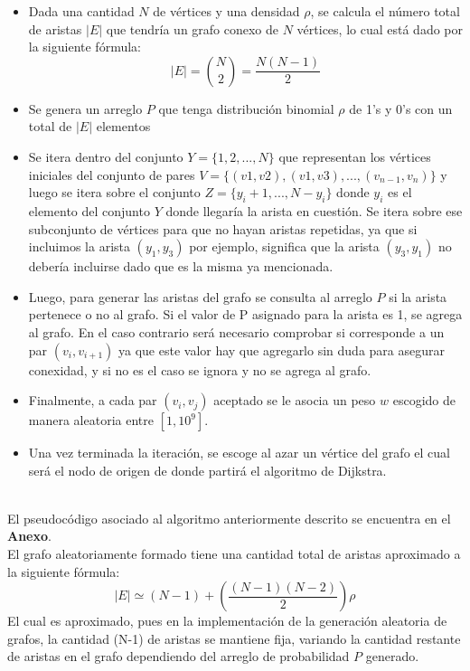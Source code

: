\documentclass[11pt]{article}
\begin{document}
\begin{itemize}
    \item Dada una cantidad $N$ de vértices y una densidad $\rho$, se calcula el número total de aristas $|E|$ que tendría un grafo conexo de $N$ vértices, lo cual está dado por la siguiente fórmula:
    \begin{equation*}
        |E| = \binom{N}{2}= \frac{N(N-1)}{2}
    \end{equation*}
    \item Se genera un arreglo $P$ que tenga distribución binomial $\rho$ de 1's y 0's con un total de $|E|$ elementos
    \item Se itera dentro del conjunto $Y = \{1,2, ..., N\}$ que representan los vértices iniciales del conjunto de pares $V = \{(v1,v2), (v1, v3), ..., (v_{n-1}, v_{n})\}$ y luego se itera sobre el conjunto $Z = \{y_i+1, ..., N-y_i\}$ donde $y_i$ es el elemento del conjunto $Y$ donde llegaría la arista en cuestión. Se itera sobre ese subconjunto de vértices para que no hayan aristas repetidas, ya que si incluimos la arista $(y_1,y_3)$ por ejemplo, significa que la arista $(y_3,y_1)$ no debería incluirse dado que es la misma ya mencionada.
    \item Luego, para generar las aristas del grafo se consulta al arreglo $P$ si la arista pertenece o no al grafo. Si el valor de P asignado para la arista es 1, se agrega al grafo. En el caso contrario será necesario comprobar si corresponde a un par $(v_i,v_{i+1})$ ya que este valor hay que agregarlo sin duda para asegurar conexidad, y si no es el caso se ignora y no se agrega al grafo.
    \item Finalmente, a cada par $(v_i, v_j)$ aceptado se le asocia un peso $w$ escogido de manera aleatoria entre $[1, 10^9]$.
    \item Una vez terminada la iteración, se escoge al azar un vértice del grafo el cual será el nodo de origen de donde partirá el algoritmo de Dijkstra.
\end{itemize}
\\
El pseudocódigo asociado al algoritmo anteriormente descrito se encuentra en el \textbf{Anexo}. 
\\
El grafo aleatoriamente formado tiene una cantidad total de aristas aproximado a la siguiente fórmula:
$$
   |E| \simeq (N-1) + \left(\frac{(N-1) (N-2)}{2}\right) \rho 
$$
El cual es aproximado, pues en la implementación de la generación aleatoria de grafos, la cantidad (N-1) de aristas se mantiene fija, variando la cantidad restante de aristas en el grafo dependiendo del arreglo de probabilidad $P$ generado.
\end{document}
